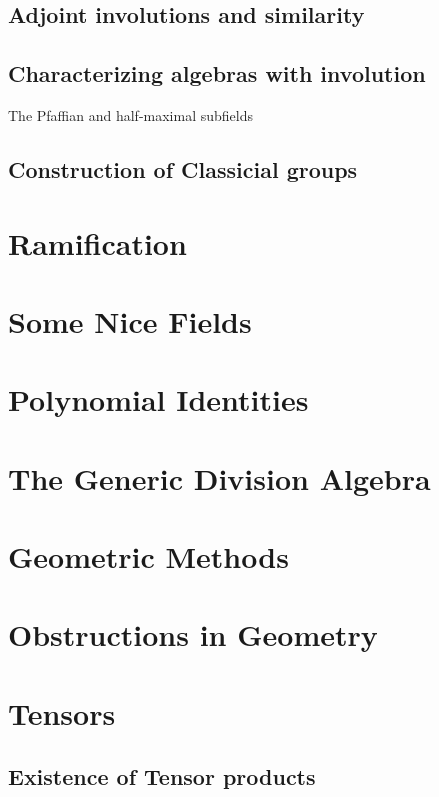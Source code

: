 \documentclass[12pt]{report}
\theoremstyle{plain}
\newcommand{\todo}[1]{\textcolor{todo}{#1}}
\begin{document}
\section{Adjoint involutions and similarity}

\section{Characterizing algebras with involution}

\todo{The Pfaffian and half-maximal subfields}

\section{Construction of Classicial groups}

\chapter{Ramification}

\chapter{Some Nice Fields}

\chapter{Polynomial Identities}

\chapter{The Generic Division Algebra}

\chapter{Geometric Methods}

\chapter{Obstructions in Geometry}

\fi

\appendix

\chapter{Tensors}


\section{Existence of Tensor products}
\end{document}
